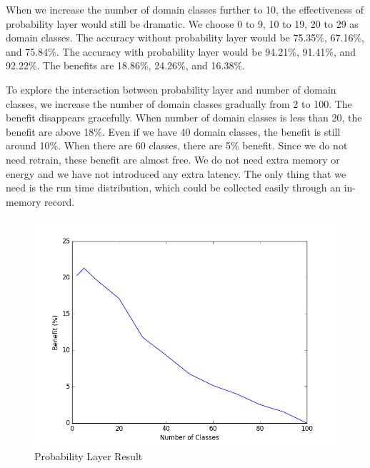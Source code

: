 \documentclass[conference]{IEEEtran}
\begin{document}
\begin{spacing}{0.9}
When we increase the number of domain classes further to 10, the effectiveness of probability layer would still be dramatic. We choose 0 to 9, 10 to 19, 20 to 29 as domain classes. The accuracy without probability layer would be 75.35\%, 67.16\%, and 75.84\%. The accuracy with probability layer would be 94.21\%, 91.41\%, and 92.22\%. The benefits are 18.86\%, 24.26\%, and 16.38\%.

To explore the interaction between probability layer and number of domain classes, we increase the number of domain classes gradually from 2 to 100. The benefit disappears gracefully. When number of domain classes is less than 20, the benefit are above 18\%. Even if we have 40 domain classes, the benefit is still around 10\%. When there are 60 classes, there are 5\% benefit. Since we do not need retrain, these benefit are almost free. We do not need extra memory or energy and we have not introduced any extra latency. The only thing that we need is the run time distribution, which could be collected easily through an in-memory record.


\begin{figure}
\includegraphics[scale=0.43]{figure_1.png}
\caption{Probability Layer Result}
\label{fig:ProbabilityLayer}
\end{figure}



\end{spacing}
\end{document}
